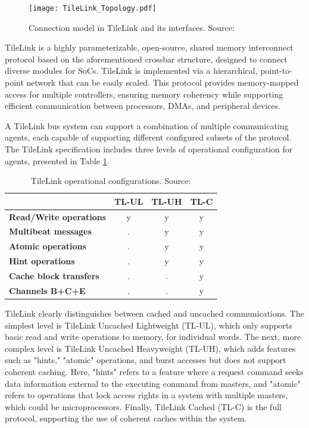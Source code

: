 \begin{figure}[h!]
    \centering
    \texttt{[image: TileLink\_Topology.pdf]}
    \caption{Connection model in TileLink and its interfaces. Source: \cite{sifive2018tilelink}}
    \label{fig:tilelink_connection_model}
\end{figure}

TileLink is a highly parameterizable, open-source, shared memory interconnect protocol based on the aforementioned crossbar structure, designed to connect diverse modules for SoCs. TileLink is implemented via a hierarchical, point-to-point network that can be easily scaled. This protocol provides memory-mapped access for multiple controllers, ensuring memory coherency while supporting efficient communication between processors, DMAs, and peripheral devices.

A TileLink bus system can support a combination of multiple communicating agents, each capable of supporting different configured subsets of the protocol. The TileLink specification includes three levels of operational configuration for agents, presented in Table \ref{tab:tilelink_configs}.

\begin{table}[h!]
\centering
\caption{TileLink operational configurations. Source: \cite{sifive2018tilelink}}
\label{tab:tilelink_configs}
\begin{tabular}{|l|c|c|c|}
\hline
 & \textbf{TL-UL} & \textbf{TL-UH} & \textbf{TL-C} \\
\hline
\textbf{Read/Write operations} & y & y & y \\
\textbf{Multibeat messages} & . & y & y \\
\textbf{Atomic operations} & . & y & y \\
\textbf{Hint operations} & . & y & y \\
\textbf{Cache block transfers} & . & . & y \\
\textbf{Channels B+C+E} & . & . & y \\
\hline
\end{tabular}
\end{table}

TileLink clearly distinguishes between cached and uncached communications. The simplest level is TileLink Uncached Lightweight (TL-UL), which only supports basic read and write operations to memory, for individual words. The next, more complex level is TileLink Uncached Heavyweight (TL-UH), which adds features such as "hints," "atomic" operations, and burst accesses but does not support coherent caching. Here, "hints" refers to a feature where a request command seeks data information external to the executing command from masters, and "atomic" refers to operations that lock access rights in a system with multiple masters, which could be microprocessors. Finally, TileLink Cached (TL-C) is the full protocol, supporting the use of coherent caches within the system.

